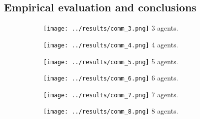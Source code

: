 \documentclass[10pt]{article}
\begin{document}
\begin{multicols}{2}
\section{Empirical evaluation and conclusions}
\begin{figure*}
	\centering
	\begin{subfigure}[b]{\textwidth}
		\centering
	\begin{minipage}{.32\linewidth}
		\centering\texttt{[image: ../results/comm\_3.png]}
		3 agents.
	\end{minipage}
	\begin{minipage}{.32\linewidth}
		\centering\texttt{[image: ../results/comm\_4.png]}
		4 agents.
	\end{minipage}
	\begin{minipage}{.32\linewidth}
		\centering\texttt{[image: ../results/comm\_5.png]}
		5 agents.
	\end{minipage}
		\begin{minipage}{.32\linewidth}
			\centering\texttt{[image: ../results/comm\_6.png]}
			6 agents.
		\end{minipage}
		\begin{minipage}{.32\linewidth}
			\centering\texttt{[image: ../results/comm\_7.png]}
			7 agents.
		\end{minipage}
		\begin{minipage}{.32\linewidth}
			\centering\texttt{[image: ../results/comm\_8.png]}
			8 agents.
		\end{minipage}
	\end{subfigure}
\setcounter{figure}{1}    
\end{figure*}
\begin{figure*}
	\centering
	\begin{subfigure}[b]{\textwidth}
		

\end{subfigure}
\end{figure*}
\end{multicols}
\end{document}
